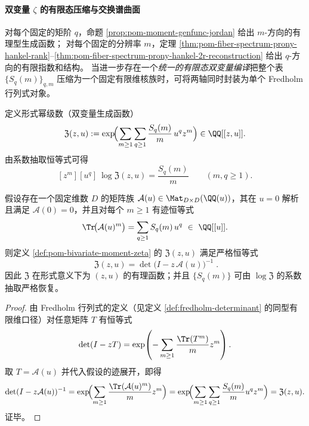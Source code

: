 \paragraph{双变量 \texorpdfstring{$\zeta$}{zeta} 的有限态压缩与交换谱曲面}
对每个固定的矩阶 \(q\)，命题 \ref{prop:pom-moment-genfunc-jordan} 给出 \(m\)-方向的有理型生成函数；
对每个固定的分辨率 \(m\)，定理 \ref{thm:pom-fiber-spectrum-prony-hankel-rank}--\ref{thm:pom-fiber-spectrum-prony-hankel-2r-reconstruction} 给出 \(q\)-方向的有限指数和结构。
当进一步存在一个\emph{统一的有限态双变量编译}把整个表 \(\{S_q(m)\}_{q,m}\) 压缩为一个固定有限维核族时，可将两轴同时封装为单个 Fredholm 行列式对象。

\begin{definition}\label{def:pom-bivariate-moment-zeta}
定义形式幂级数（双变量生成函数）
\[
\mathfrak{Z}(z,u)
:=\exp\!\Bigl(\sum_{m\ge 1}\sum_{q\ge 1}\frac{S_q(m)}{m}\,u^{q}z^{m}\Bigr)
\in \QQ[[z,u]].
\]
由系数抽取恒等式可得
\[
[z^m][u^q]\ \log\mathfrak{Z}(z,u)=\frac{S_q(m)}{m}\qquad(m,q\ge 1).
\]
\end{definition}

\begin{theorem}\label{thm:pom-bivariate-moment-zeta-fredholm}
假设存在一个固定维数 \(D\) 的矩阵族 \(\mathcal{A}(u)\in\Mat_{D\times D}(\QQ(u))\)，其在 \(u=0\) 解析且满足 \(\mathcal{A}(0)=0\)，并且对每个 \(m\ge 1\) 有迹恒等式
\[
\Tr\!\bigl(\mathcal{A}(u)^m\bigr)=\sum_{q\ge 1} S_q(m)\,u^{q}\ \in\ \QQ[[u]].
\]
则定义 \ref{def:pom-bivariate-moment-zeta} 的 \(\mathfrak{Z}(z,u)\) 满足严格恒等式
\[
\boxed{\;
\mathfrak{Z}(z,u)=\det\bigl(I-z\,\mathcal{A}(u)\bigr)^{-1}\; }.
\]
因此 \(\mathfrak{Z}\) 在形式意义下为 \((z,u)\) 的有理函数；并且 \(\{S_q(m)\}\) 可由 \(\log\mathfrak{Z}\) 的系数抽取严格恢复。
\end{theorem}
\begin{proof}
由 Fredholm 行列式的定义（见定义 \ref{def:fredholm-determinant} 的同型有限维口径）对任意矩阵 \(T\) 有恒等式
\[
\det(I-zT)=\exp\!\left(-\sum_{m\ge 1}\frac{\Tr(T^m)}{m}z^m\right).
\]
取 \(T=\mathcal{A}(u)\) 并代入假设的迹展开，即得
\[
\det(I-z\mathcal{A}(u))^{-1}
=\exp\!\Bigl(\sum_{m\ge 1}\frac{\Tr(\mathcal{A}(u)^m)}{m}z^m\Bigr)
=\exp\!\Bigl(\sum_{m\ge 1}\sum_{q\ge 1}\frac{S_q(m)}{m}u^q z^m\Bigr)
=\mathfrak{Z}(z,u).
\]
证毕。
\end{proof}

